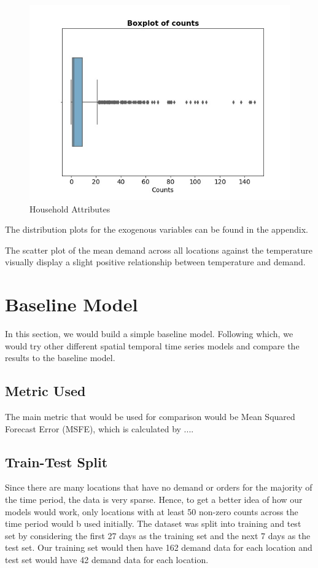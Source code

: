 \documentclass[10pt, letterpaper] {article}
\begin{document}
\begin{figure}[H]
    \centering
    \includegraphics[width=\textwidth]{Images/boxplot_counts.jpg}
    \caption{Household Attributes}
    \label{fig:Household Attributes}
\end{figure}

The distribution plots for the exogenous variables can be found in the appendix. 

The scatter plot of the mean demand across all locations against the temperature visually display a slight positive relationship between temperature and demand. 

\section{Baseline Model}
In this section, we would build a simple baseline model. Following which, we would try other different spatial temporal time series models and compare the results to the baseline model. 

\subsection{Metric Used}
The main metric that would be used for comparison would be Mean Squared Forecast Error (MSFE), which is calculated by ....

\subsection{Train-Test Split}
Since there are many locations that have no demand or orders for the majority of the time period, the data is very sparse. Hence, to get a better idea of how our models would work, only locations with at least 50 non-zero counts across the time period would b used initially. The dataset was split into training and test set by considering the first 27 days as the training set and the next 7 days as the test set. Our training set would then have 162 demand data for each location and test set would have 42 demand data for each location. 
\end{document}
